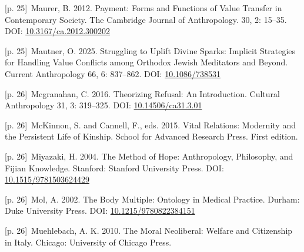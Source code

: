 \documentclass[10pt,a4paper]{article}
\begin{document}
\noindent\begin{minipage}[t]{\linewidth}{\scriptsize\color{gray} [p. 25]}\ Maurer, B. 2012. Payment: Forms and Functions of Value Transfer in Contemporary Society. The Cambridge Journal of Anthropology. 30, 2: 15–35. DOI: \url{10.3167/ca.2012.300202}\par\end{minipage}\par
\noindent\begin{minipage}[t]{\linewidth}{\scriptsize\color{gray} [p. 25]}\ Mautner, O. 2025. Struggling to Uplift Divine Sparks: Implicit Strategies for Handling Value Conflicts among Orthodox Jewish Meditators and Beyond. Current Anthropology 66, 6: 837–862. DOI: \url{10.1086/738531}\par\end{minipage}\par
\noindent\begin{minipage}[t]{\linewidth}{\scriptsize\color{gray} [p. 26]}\ Mcgranahan, C. 2016. Theorizing Refusal: An Introduction. Cultural Anthropology 31, 3: 319–325. DOI: \url{10.14506/ca31.3.01}\par\end{minipage}\par
\noindent\begin{minipage}[t]{\linewidth}{\scriptsize\color{gray} [p. 26]}\ McKinnon, S. and Cannell, F., eds. 2015. Vital Relations: Modernity and the Persistent Life of Kinship. School for Advanced Research Press. First edition.\par\end{minipage}\par
\noindent\begin{minipage}[t]{\linewidth}{\scriptsize\color{gray} [p. 26]}\ Miyazaki, H. 2004. The Method of Hope: Anthropology, Philosophy, and Fijian Knowledge. Stanford: Stanford University Press. DOI: \url{10.1515/9781503624429}\par\end{minipage}\par
\noindent\begin{minipage}[t]{\linewidth}{\scriptsize\color{gray} [p. 26]}\ Mol, A. 2002. The Body Multiple: Ontology in Medical Practice. Durham: Duke University Press. DOI: \url{10.1215/9780822384151}\par\end{minipage}\par
\noindent\begin{minipage}[t]{\linewidth}{\scriptsize\color{gray} [p. 26]}\ Muehlebach, A. K. 2010. The Moral Neoliberal: Welfare and Citizenship in Italy. Chicago: University of Chicago Press.\par\end{minipage}\par
\end{document}
